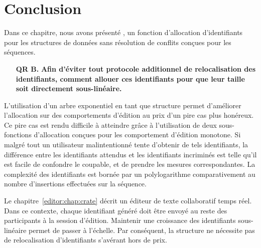 
\section{Conclusion}
\label{repl:sec:conclusion}

Dans ce chapitre, nous avons présenté \LSEQ, un fonction d'allocation
d'identifiants pour les structures de données sans résolution de conflits
conçues pour les séquences. 

\begin{itemize}
\item [\textbf{QR B.}] \textbf{Afin d'éviter tout protocole additionnel de
    relocalisation des identifiants, comment allouer ces identifiants pour que
    leur taille soit directement sous-linéaire.}
\end{itemize}

L'utilisation d'un arbre exponentiel en tant que structure permet d'améliorer
l'allocation sur des comportements d'édition au prix d'un pire cas plus
honéreux. Ce pire cas est rendu difficile à atteindre grâce à l'utilisation de
deux sous-fonctions d'allocation conçues pour les comportement d'édition
monotone. Si malgré tout un utilisateur malintentionné tente d'obtenir de tels
identifiants, la différence entre les identifiants attendus et les identifiants
incriminés est telle qu'il est facile de confondre le coupable, et de prendre
les mesures correspondantes. La complexité des identifiants \LSEQ est bornée par
un polylogarithme comparativement au nombre d'insertions effectuées sur la
séquence.

Le chapitre~\ref{editor:chap:crate} décrit un éditeur de texte collaboratif
temps réel. Dans ce contexte, chaque identifiant généré doit être envoyé au
reste des participants à la session d'édition. Maintenir une croissance des
identifiants sous-linéaire permet de passer à l'échelle. Par conséquent, la
structure ne nécessite pas de relocalisation d'identifiants s'avérant hors de
prix.

